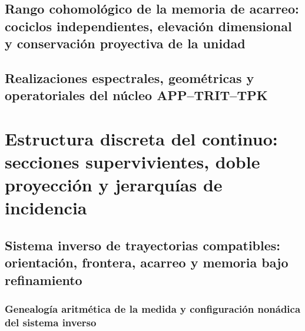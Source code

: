\chapter{Rango cohomológico de la memoria de acarreo: cociclos independientes, elevación dimensional y conservación proyectiva de la unidad}
\label{chap:sucesor-102-02}
\begin{HMTScientificOwnerSubordinated}

\end{HMTScientificOwnerSubordinated}

\chapter{Realizaciones espectrales, geométricas y operatoriales del núcleo APP–TRIT–TPK}
\label{chap:sucesor-102-03}
\label{owner:sucesor-102-03k-genealogia-operaciones}


\part{Estructura discreta del continuo: secciones supervivientes, doble proyección y jerarquías de incidencia}

\chapter{Sistema inverso de trayectorias compatibles: orientación, frontera, acarreo y memoria bajo refinamiento}
\label{chap:sucesor-102-04}
\label{owner:sucesor-102-04b-cadena-conjunta-inicio}
\section{Genealogía aritmética de la medida y configuración nonádica del sistema inverso}
\begin{HMTScientificOwnerSubordinated}

\end{HMTScientificOwnerSubordinated}


